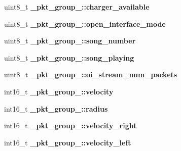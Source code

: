 \begin{DoxyCompactItemize}
\item 
\hypertarget{group__roomba-lib_gaf2998b6db33b57101022655fbae35d4d}{}uint8\+\_\+t {\bfseries \+\_\+pkt\+\_\+group\+\_\+::charger\+\_\+available}\label{group__roomba-lib_gaf2998b6db33b57101022655fbae35d4d}

\item 
\hypertarget{group__roomba-lib_ga95f014b775e0a88146275cc8c02fd0a6}{}uint8\+\_\+t {\bfseries \+\_\+pkt\+\_\+group\+\_\+::open\+\_\+interface\+\_\+mode}\label{group__roomba-lib_ga95f014b775e0a88146275cc8c02fd0a6}

\item 
\hypertarget{group__roomba-lib_gaa6217d6706245d585e199f0f68a267e6}{}uint8\+\_\+t {\bfseries \+\_\+pkt\+\_\+group\+\_\+::song\+\_\+number}\label{group__roomba-lib_gaa6217d6706245d585e199f0f68a267e6}

\item 
\hypertarget{group__roomba-lib_gaef36cb1a116e22e532a0bb1749b613cd}{}uint8\+\_\+t {\bfseries \+\_\+pkt\+\_\+group\+\_\+::song\+\_\+playing}\label{group__roomba-lib_gaef36cb1a116e22e532a0bb1749b613cd}

\item 
\hypertarget{group__roomba-lib_gab222e529ead66fbcc944874273461685}{}uint8\+\_\+t {\bfseries \+\_\+pkt\+\_\+group\+\_\+::oi\+\_\+stream\+\_\+num\+\_\+packets}\label{group__roomba-lib_gab222e529ead66fbcc944874273461685}

\item 
\hypertarget{group__roomba-lib_ga467761ebc543ee859377b24c2753bb07}{}int16\+\_\+t {\bfseries \+\_\+pkt\+\_\+group\+\_\+::velocity}\label{group__roomba-lib_ga467761ebc543ee859377b24c2753bb07}

\item 
\hypertarget{group__roomba-lib_gaaea9910e6bafda799f0b50dcfe30fd67}{}int16\+\_\+t {\bfseries \+\_\+pkt\+\_\+group\+\_\+::radius}\label{group__roomba-lib_gaaea9910e6bafda799f0b50dcfe30fd67}

\item 
\hypertarget{group__roomba-lib_ga521639ee0605d21dd4a3003e41ccb9fc}{}int16\+\_\+t {\bfseries \+\_\+pkt\+\_\+group\+\_\+::velocity\+\_\+right}\label{group__roomba-lib_ga521639ee0605d21dd4a3003e41ccb9fc}

\item 
\hypertarget{group__roomba-lib_gaf43d79ba2a8a202a6cba221a59f38e4e}{}int16\+\_\+t {\bfseries \+\_\+pkt\+\_\+group\+\_\+::velocity\+\_\+left}\label{group__roomba-lib_gaf43d79ba2a8a202a6cba221a59f38e4e}


\end{DoxyCompactItemize}
